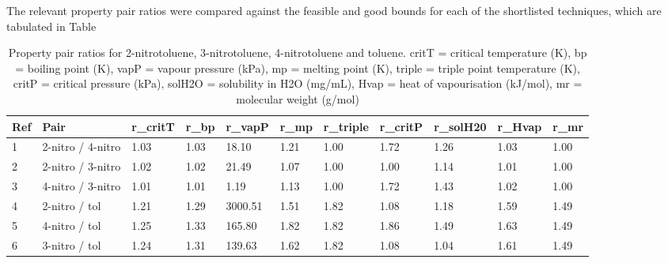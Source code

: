 The relevant property pair ratios were compared against the feasible and good bounds for each of the shortlisted techniques, which are tabulated in Table 

\begin{table}[h]
\centering
\caption{Property pair ratios for 2-nitrotoluene, 3-nitrotoluene, 4-nitrotoluene and toluene. critT = critical temperature (K), bp = boiling point (K), vapP = vapour pressure (kPa), mp = melting point (K), triple = triple point temperature (K), critP = critical pressure (kPa), solH2O = solubility in H2O (mg/mL), Hvap = heat of vapourisation (kJ/mol), mr = molecular weight (g/mol)}
\label{tab:jaksland}\footnotesize
\begin{tabular}{@{}lllllllllll@{}}
\toprule
Ref & Pair              & r\_critT & r\_bp & r\_vapP & r\_mp & r\_triple & r\_critP & r\_solH20 & r\_Hvap & r\_mr \\ \midrule
1   & 2-nitro / 4-nitro & 1.03     & 1.03  & 18.10   & 1.21  & 1.00      & 1.72     & 1.26      & 1.03    & 1.00  \\
2   & 2-nitro / 3-nitro & 1.02     & 1.02  & 21.49   & 1.07  & 1.00      & 1.00     & 1.14      & 1.01    & 1.00  \\
3   & 4-nitro / 3-nitro & 1.01     & 1.01  & 1.19    & 1.13  & 1.00      & 1.72     & 1.43      & 1.02    & 1.00  \\
4   & 2-nitro / tol     & 1.21     & 1.29  & 3000.51 & 1.51  & 1.82      & 1.08     & 1.18      & 1.59    & 1.49  \\
5   & 4-nitro / tol     & 1.25     & 1.33  & 165.80  & 1.82  & 1.82      & 1.86     & 1.49      & 1.63    & 1.49  \\
6   & 3-nitro / tol     & 1.24     & 1.31  & 139.63  & 1.62  & 1.82      & 1.08     & 1.04      & 1.61    & 1.49  \\ \bottomrule
\end{tabular}
\end{table}


